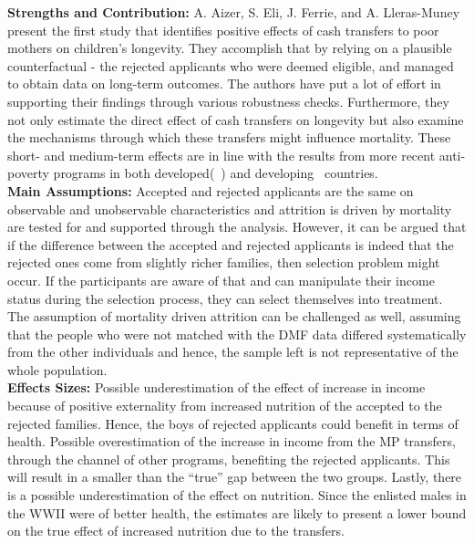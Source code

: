 \textbf{Strengths and Contribution:} A. Aizer, S. Eli, J. Ferrie, and A. Lleras-Muney present the first study that identifies positive effects of cash transfers to poor mothers on children's longevity. They accomplish that by relying on a plausible counterfactual - the rejected applicants who were deemed eligible, and managed to obtain data on long-term outcomes. The authors have put a lot of effort in supporting their findings through various robustness checks. Furthermore, they not only estimate the direct effect of cash transfers on longevity but also examine the mechanisms through which these transfers might influence mortality. These short- and medium-term effects are in line with the results from more recent anti-poverty programs in both developed(~\citep{almond2011inside, hoynes2016long, dahl2012impact, milligan2011child}) and developing~\citep{barham2011healthier, barham2013living} countries. \\
\textbf{Main Assumptions:} Accepted and rejected applicants are the same on observable and unobservable characteristics and attrition is driven by mortality are tested for and supported through the analysis. However, it can be argued that if the difference between the accepted and rejected applicants is indeed that the rejected ones come from slightly richer families, then selection problem might occur. If the participants are aware of that and can manipulate their income status during the selection process, they can select themselves into treatment. The assumption of mortality driven attrition can be challenged as well, assuming that the people who were not matched with the DMF data differed systematically from the other individuals and hence, the sample left is not representative of the whole population. \\
\textbf{Effects Sizes:} Possible underestimation of the effect of increase in income because of positive
externality from increased nutrition of the accepted to the rejected families. Hence, the boys of rejected applicants could benefit in terms of health. Possible overestimation of the increase in income from the MP transfers, through the channel of other programs, benefiting the rejected applicants. This will result in a smaller than the ``true'' gap between the two groups. Lastly, there is a possible underestimation of the effect on nutrition. Since the enlisted males in the WWII were of better health, the estimates are likely to present a lower bound on the true effect of increased nutrition due to the transfers. \\
